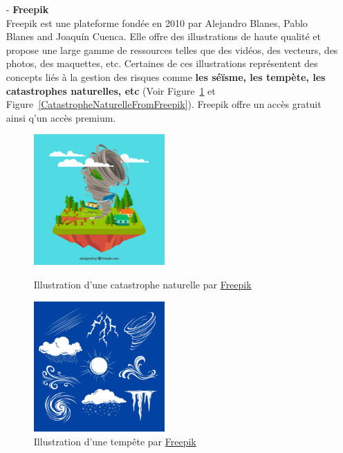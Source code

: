 			\begin{itemize}
				\item[-] \textbf{Freepik}\\
					Freepik est une plateforme fond\'ee en 2010 par Alejandro Blanes, Pablo Blanes and Joaqu\'in Cuenca. Elle offre des illustrations de haute qualit\'e et propose une large gamme de ressources telles que des vid\'eos, des vecteurs, des photos, des maquettes, etc. Certaines de ces illustrations repr\'esentent des concepts li\'es \`a la gestion des risques comme \textbf{les s\'e\"isme, les temp\`ete, les catastrophes naturelles, etc} (Voir Figure~\ref{TempeteFromFreepik} et Figure~\ref{CatastropheNaturelleFromFreepik}). Freepik offre un acc\`es gratuit ainsi q'un acc\`es premium.\\

					\begin{figure}[ht]
						\vspace{10pt}
						\centering
						\begin{minipage}{0.45\textwidth}
							\centering
							\includegraphics[width=5cm]{Pictures/CatastropheNaturelleFreepik.jpg}
							\caption{Illustration d'une catastrophe naturelle par \href{https://www.freepik.com/}{Freepik}}
							\label{CatastropheNaturelleFromFreepik}
						\end{minipage}
						\hspace{10pt}
						\begin{minipage}{0.45\textwidth}
							\centering
							\includegraphics[width=5cm]{Pictures/TempeteFreepik.jpg}
							\caption{Illustration d'une temp\^ete par \href{https://www.freepik.com/}{Freepik}}
							\label{TempeteFromFreepik}
						\end{minipage}
					\end{figure}


\end{itemize}
